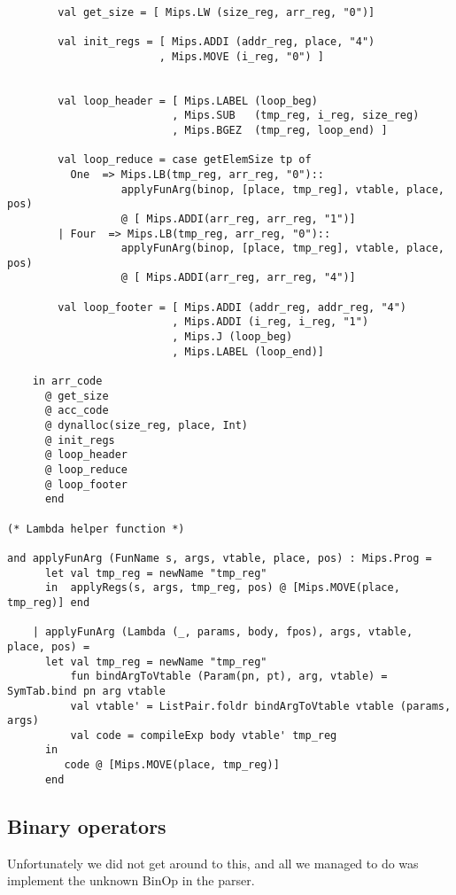\documentclass[12pt]{article}
\begin{document}
\begin{verbatim}
        
        val get_size = [ Mips.LW (size_reg, arr_reg, "0")]

        val init_regs = [ Mips.ADDI (addr_reg, place, "4")
                        , Mips.MOVE (i_reg, "0") ]


        val loop_header = [ Mips.LABEL (loop_beg)
                          , Mips.SUB   (tmp_reg, i_reg, size_reg)
                          , Mips.BGEZ  (tmp_reg, loop_end) ]

        val loop_reduce = case getElemSize tp of
          One  => Mips.LB(tmp_reg, arr_reg, "0")::
                  applyFunArg(binop, [place, tmp_reg], vtable, place, pos)
                  @ [ Mips.ADDI(arr_reg, arr_reg, "1")]
        | Four  => Mips.LB(tmp_reg, arr_reg, "0")::
                  applyFunArg(binop, [place, tmp_reg], vtable, place, pos)
                  @ [ Mips.ADDI(arr_reg, arr_reg, "4")]

        val loop_footer = [ Mips.ADDI (addr_reg, addr_reg, "4")
                          , Mips.ADDI (i_reg, i_reg, "1")
                          , Mips.J (loop_beg)
                          , Mips.LABEL (loop_end)]

    in arr_code
      @ get_size
      @ acc_code
      @ dynalloc(size_reg, place, Int)
      @ init_regs
      @ loop_header
      @ loop_reduce
      @ loop_footer
      end

(* Lambda helper function *)

and applyFunArg (FunName s, args, vtable, place, pos) : Mips.Prog =
      let val tmp_reg = newName "tmp_reg"
      in  applyRegs(s, args, tmp_reg, pos) @ [Mips.MOVE(place, tmp_reg)] end

    | applyFunArg (Lambda (_, params, body, fpos), args, vtable, place, pos) =
      let val tmp_reg = newName "tmp_reg"
          fun bindArgToVtable (Param(pn, pt), arg, vtable) = SymTab.bind pn arg vtable
          val vtable' = ListPair.foldr bindArgToVtable vtable (params, args)
          val code = compileExp body vtable' tmp_reg
      in
         code @ [Mips.MOVE(place, tmp_reg)]
      end
\end{verbatim}
\subsection{Binary operators}
Unfortunately we did not get around to this, and all we managed to do was implement the unknown BinOp in the parser.
\clearpage
\end{document}
